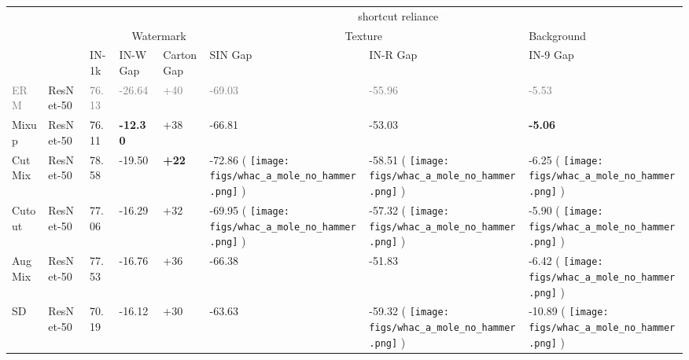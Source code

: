 \documentclass[10pt,twocolumn,letterpaper]{article}
\DeclareRobustCommand{\molenohammer}{\begingroup\normalfont
  \texttt{[image: figs/whac\_a\_mole\_no\_hammer.png]}\endgroup
}
\begin{document}
\begin{table*}[h]
\centering
\begin{adjustbox}{width=\linewidth}
\begin{tabular}{@{}llllllll@{}}
\toprule
     &                    & \multicolumn{1}{l|}{}      & \multicolumn{5}{c}{shortcut reliance}                                                                                                                                 \\ \cmidrule(l){4-8}
    &         & \multicolumn{1}{l|}{}      & \multicolumn{2}{c|}{Watermark}                                     & \multicolumn{2}{c|}{Texture}                                             & Background            \\
    &                       & \multicolumn{1}{l|}{IN-1k} & IN-W Gap  & \multicolumn{1}{l|}{Carton Gap } & SIN Gap             & \multicolumn{1}{l|}{IN-R Gap } & IN-9 Gap    \\ \midrule
\textcolor{gray}{ERM}   & ResNet-50             & \textcolor{gray}{76.13}                & \textcolor{gray}{-26.64}         & \textcolor{gray}{+40}                  & \textcolor{gray}{-69.03}               & \textcolor{gray}{-55.96}               & \textcolor{gray}{-5.53}                \\
Mixup   & ResNet-50                       & 76.11                & \textbf{-12.30}      & +38                  & -66.81               & -53.03               & \textbf{-5.06}       \\
CutMix   & ResNet-50                      & 78.58       & -19.50               & \textbf{+22}         & -72.86 (\textcolor{red}{} \molenohammer)              & -58.51 (\textcolor{red}{} \molenohammer)        & -6.25 (\textcolor{red}{} \molenohammer)               \\
Cutout   & ResNet-50                    & 77.06                & -16.29               & +32                  & -69.95 (\textcolor{red}{} \molenohammer)        & -57.32 (\textcolor{red}{} \molenohammer)              & -5.90 (\textcolor{red}{} \molenohammer)               \\
AugMix  & ResNet-50                  & 77.53                & -16.76               & +36                  & -66.38               & -51.83               & -6.42  (\textcolor{red}{} \molenohammer)              \\
SD   & ResNet-50      & 70.19                & -16.12               & +30                  & -63.63               & -59.32  (\textcolor{red}{} \molenohammer)             & -10.89 (\textcolor{red}{} \molenohammer)      \\

\end{tabular}
\end{adjustbox}
\end{table*}
\end{document}
